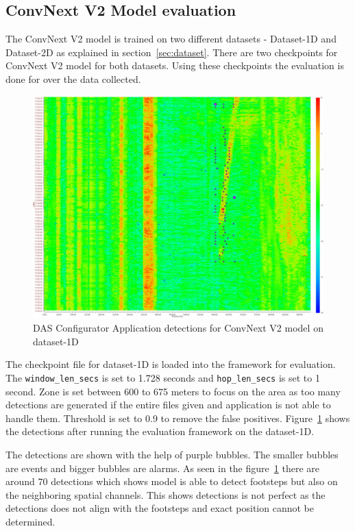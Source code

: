 \subsection{ConvNext V2 Model evaluation}
\label{sec:conv_eval}
The ConvNext V2 model is trained on two different datasets - Dataset-1D and Dataset-2D as explained in section~\ref{sec:dataset}. There are two checkpoints for ConvNext V2 model for both datasets. Using these checkpoints the evaluation is done for over the data collected. 
\begin{figure}[h]
  \centering
  \includegraphics[width=0.9\linewidth]{Bilder/jpg/conv_1d_eval.jpg}
  \caption{DAS Configurator Application detections for ConvNext V2 model on dataset-1D}
  \label{conv_1d_eval}
\end{figure}

The checkpoint file for dataset-1D is loaded into the framework for evaluation. The \texttt{window\_len\_secs} is set to 1.728 seconds and \texttt{hop\_len\_secs} is set to 1 second. Zone is set between 600 to 675 meters to focus on the area as too many detections are generated if the entire files given and application is not able to handle them. Threshold is set to 0.9 to remove the false positives. Figure~\ref{conv_1d_eval} shows the detections after running the evaluation framework on the dataset-1D. 

The detections are shown with the help of purple bubbles. The smaller bubbles are events and bigger bubbles are alarms. As seen in the figure~\ref{conv_1d_eval} there are around 70 detections which shows model is able to detect footsteps but also on the neighboring spatial channels. This shows detections is not perfect as the detections does not align with the footsteps and exact position cannot be determined.

